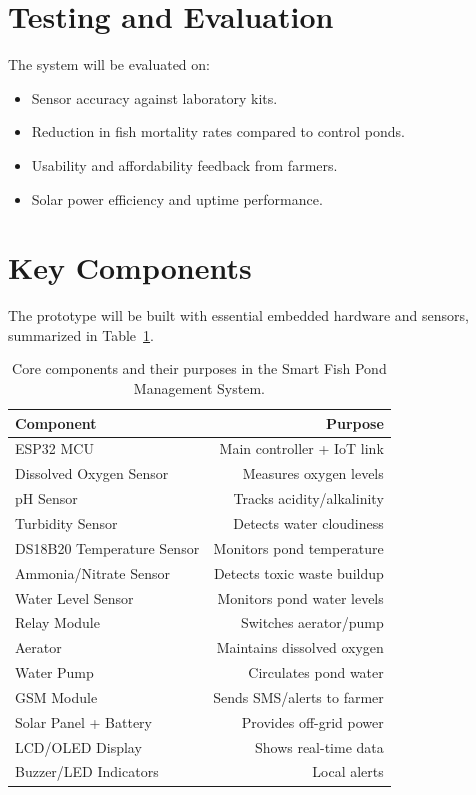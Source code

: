 \documentclass[12pt,a4paper]{report}
\begin{document}
\section{Testing and Evaluation}
The system will be evaluated on:
\begin{itemize}
    \item Sensor accuracy against laboratory kits.
    \item Reduction in fish mortality rates compared to control ponds.
    \item Usability and affordability feedback from farmers.
    \item Solar power efficiency and uptime performance.
\end{itemize}

\section{Key Components}
The prototype will be built with essential embedded hardware and sensors, summarized in Table~\ref{tab:components}.

\begin{table}[H]
\centering
\renewcommand{\arraystretch}{1.3}
\begin{tabular}{|l|r|}
\hline
\rowcolor{gray!25}
\textbf{Component} & \textbf{Purpose} \\
\hline
ESP32 MCU & Main controller + IoT link \\
\hline
Dissolved Oxygen Sensor & Measures oxygen levels \\
\hline
pH Sensor & Tracks acidity/alkalinity \\
\hline
Turbidity Sensor & Detects water cloudiness \\
\hline
DS18B20 Temperature Sensor & Monitors pond temperature \\
\hline
Ammonia/Nitrate Sensor & Detects toxic waste buildup \\
\hline
Water Level Sensor & Monitors pond water levels \\
\hline
Relay Module & Switches aerator/pump \\
\hline
Aerator & Maintains dissolved oxygen \\
\hline
Water Pump & Circulates pond water \\
\hline
GSM Module & Sends SMS/alerts to farmer \\
\hline
Solar Panel + Battery & Provides off-grid power \\
\hline
LCD/OLED Display & Shows real-time data \\
\hline
Buzzer/LED Indicators & Local alerts \\
\hline
\end{tabular}
\caption{Core components and their purposes in the Smart Fish Pond Management System.}
\label{tab:components}
\end{table}
\end{document}

